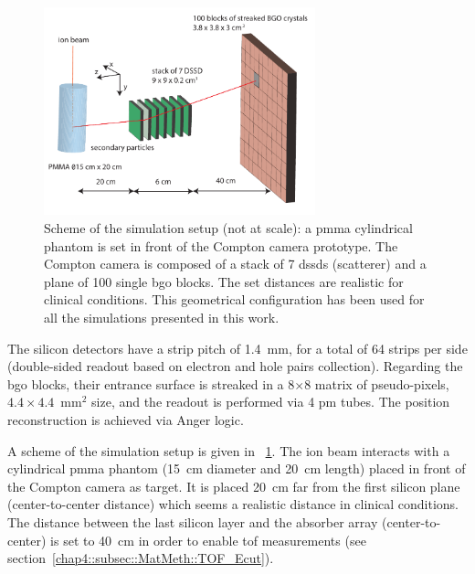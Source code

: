 \begin{figure}	
  \centering
  \includegraphics[width=0.7\textwidth]{03_GraphicFiles/chapter4_HTsimu/Compton_Camera_hadontherapy_PMMA_Cylinder_EN.pdf}
  \caption{Scheme of the simulation setup (not at scale): a \gls{pmma} cylindrical phantom is set in front of the Compton camera prototype. The Compton camera is composed of a stack of 7 \glspl{dssd} (scatterer) and a plane of 100 single \gls{bgo} blocks. The set distances are realistic for clinical conditions. This geometrical configuration has been used for all the simulations presented in this work.}
  \label{chap4::fig::fig_setup_CC_simulation_Hadronth}
\end{figure}

The silicon detectors have a strip pitch of 1.4~mm, for a total of 64 strips per side (double-sided readout based on electron and hole pairs collection). 
Regarding the \gls{bgo} blocks, their entrance surface is streaked in a 8$\times$8 matrix of pseudo-pixels, $4.4\times4.4$~mm$^{2}$ size, and the readout is performed via 4 \gls{pm} tubes. The position reconstruction is achieved via Anger logic.

A scheme of the simulation setup is given in \figurename~\ref{chap4::fig::fig_setup_CC_simulation_Hadronth}. The ion beam interacts with a cylindrical \gls{pmma} phantom (15~cm diameter and 20~cm length) placed in front of the Compton camera as target. It is placed 20~cm far from the first silicon plane (center-to-center distance) which seems a realistic distance in clinical conditions. The distance between the last silicon layer and the absorber array (center-to-center) is set to 40~cm in order to enable \gls{tof} measurements (see section~\ref{chap4::subsec::MatMeth::TOF_Ecut}).

